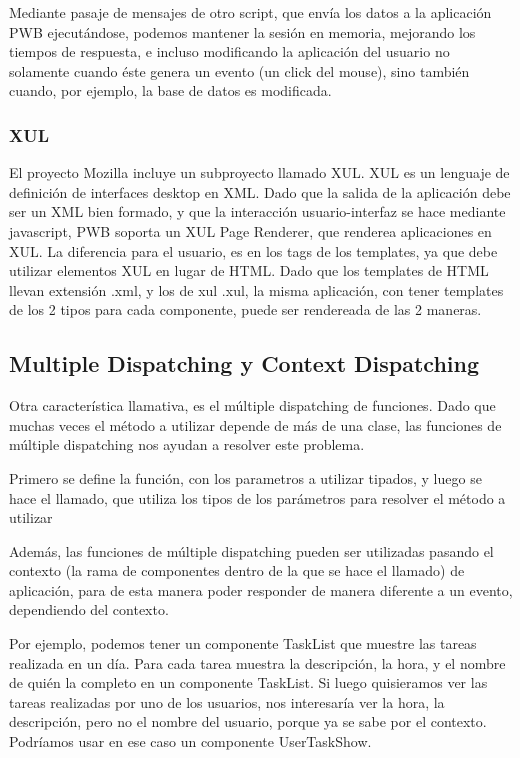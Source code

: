 Mediante pasaje de mensajes de otro script, que envía los datos a la aplicación PWB ejecutándose, podemos
mantener la sesión en memoria, mejorando los tiempos de respuesta, e incluso modificando la aplicación del
usuario no solamente cuando éste genera un evento (un click del mouse), sino también cuando, por ejemplo, la base
de datos es modificada.

\subsubsection{XUL}

El proyecto Mozilla incluye un subproyecto llamado XUL. XUL es un lenguaje de definición de interfaces desktop
en XML. Dado que la salida de la aplicación debe ser un XML bien formado, y que la interacción usuario-interfaz
se hace mediante javascript, PWB soporta un XUL Page Renderer, que renderea aplicaciones en XUL. La
diferencia para el usuario, es en los tags de los templates, ya que debe utilizar elementos XUL en lugar de
HTML. Dado que los templates de HTML llevan extensión .xml, y los de xul .xul, la misma aplicación, con tener
templates de los 2 tipos para cada componente, puede ser rendereada de las 2 maneras.

\subsection{Multiple Dispatching y Context Dispatching}

Otra característica llamativa, es el múltiple dispatching de funciones.
Dado que muchas veces el método a utilizar depende de más de una clase, las funciones de múltiple dispatching nos ayudan a resolver este problema.

Primero se define la función, con los parametros a utilizar tipados, y luego se hace el llamado, que utiliza los tipos de los parámetros para
resolver el método a utilizar

Además, las funciones de múltiple dispatching pueden ser utilizadas pasando el contexto (la rama de componentes dentro de la que se hace el llamado)
de aplicación, para de esta manera poder responder de manera diferente a un evento, dependiendo del contexto.

Por ejemplo, podemos tener un componente TaskList que muestre las tareas realizada en un día. Para cada tarea muestra la descripción, la hora, y el
nombre de quién la completo en un componente TaskList. Si luego quisieramos ver las tareas realizadas por uno de los usuarios, nos interesaría ver
la hora, la descripción, pero no el nombre del usuario, porque ya se sabe por el contexto. Podríamos usar en ese caso un componente UserTaskShow.

